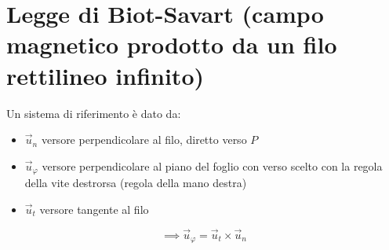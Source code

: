 \section{Legge di Biot-Savart (campo magnetico prodotto da un filo rettilineo infinito)}

Un sistema di riferimento è dato da:

\begin{itemize}
	\item $\vec{u}_n$ versore perpendicolare al filo, diretto verso $P$
	\item $\vec{u}_{\varphi}$ versore perpendicolare al piano del foglio con verso scelto con la regola della vite destrorsa (regola della mano destra)
	\item $\vec{u}_t$ versore tangente al filo
\end{itemize}

\[
	\implies \vec{u}_{\varphi}=\vec{u}_t\times \vec{u}_n
\]

